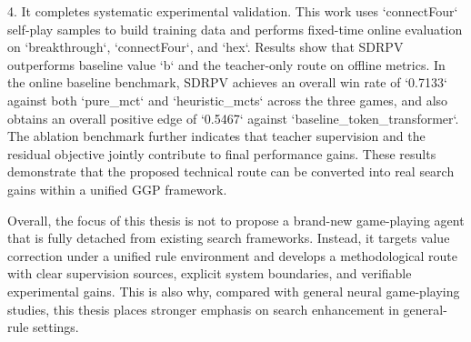 
4. It completes systematic experimental validation. This work uses `connectFour` self-play samples to build training data and performs fixed-time online evaluation on `breakthrough`, `connectFour`, and `hex`. Results show that SDRPV outperforms baseline value `b` and the teacher-only route on offline metrics. In the online baseline benchmark, SDRPV achieves an overall win rate of `0.7133` against both `pure_mct` and `heuristic_mcts` across the three games, and also obtains an overall positive edge of `0.5467` against `baseline_token_transformer`. The ablation benchmark further indicates that teacher supervision and the residual objective jointly contribute to final performance gains. These results demonstrate that the proposed technical route can be converted into real search gains within a unified GGP framework.

% 

Overall, the focus of this thesis is not to propose a brand-new game-playing agent that is fully detached from existing search frameworks. Instead, it targets value correction under a unified rule environment and develops a methodological route with clear supervision sources, explicit system boundaries, and verifiable experimental gains. This is also why, compared with general neural game-playing studies, this thesis places stronger emphasis on search enhancement in general-rule settings.


